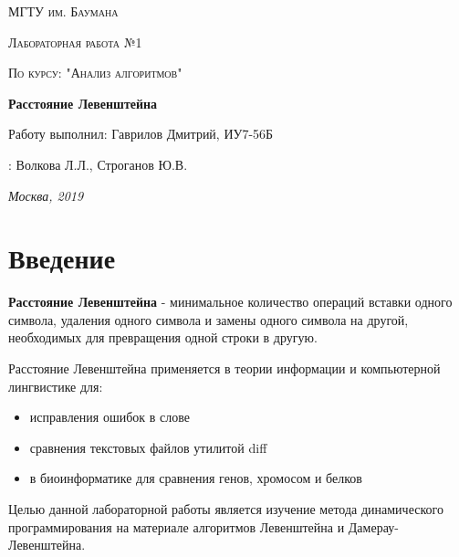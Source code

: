 \documentclass[12pt]{report}
\begin{document}
\begin{titlepage}
	\centering
	{\scshape\LARGE МГТУ им. Баумана \par}
	\vspace{3cm}
	{\scshape\Large Лабораторная работа №1\par}
	\vspace{0.5cm}	
	{\scshape\Large По курсу: "Анализ алгоритмов"\par}
	\vspace{1.5cm}
	{\huge\bfseries Расстояние Левенштейна\par}
	\vspace{2cm}
	\Large Работу выполнил: Гаврилов Дмитрий, ИУ7-56Б\par
	\vspace{0.5cm}
	:  Волкова Л.Л., Строганов Ю.В.\par

	\vfill
	\large \textit {Москва, 2019} \par
\end{titlepage}

\tableofcontents

\newpage
\chapter*{Введение}
\textbf{Расстояние Левенштейна} - минимальное количество операций вставки одного символа, удаления одного символа и замены одного символа на другой, необходимых для превращения одной строки в другую.

Расстояние Левенштейна применяется в теории информации и компьютерной лингвистике для:

\begin{itemize}
	\item исправления ошибок в слове
	\item сравнения текстовых файлов утилитой diff
	\item в биоинформатике для сравнения генов, хромосом и белков
\end{itemize}

Целью данной лабораторной работы является изучение метода динамического программирования на материале алгоритмов
Левенштейна и Дамерау-Левенштейна. 
\end{document}
